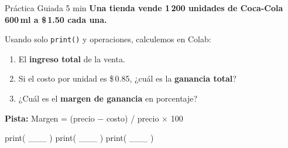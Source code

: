 \documentclass[aspectratio=169, 11pt]{beamer}
\begin{document}
\begin{frame}[fragile]{Práctica Guiada \hfill {\normalsize\color{arcaRed}\faClock\hspace{4pt}5 min}}
  \vspace{-6pt}
  {\small\color{arcaDark}\bfseries
    Una tienda vende 1\,200 unidades de Coca-Cola 600\,ml a \$\,1.50 cada una.}

  \vspace{6pt}
  {\footnotesize\color{textMuted}
  Usando solo \texttt{print()} y operaciones, calculemos en Colab:}

  \vspace{4pt}
  {\footnotesize
  \begin{enumerate}\setlength{\itemsep}{3pt}
    \item[{\color{arcaRed}\bfseries 1.}]
      El \textbf{ingreso total} de la venta.
    \item[{\color{arcaRed}\bfseries 2.}]
      Si el costo por unidad es \$\,0.85, ¿cuál es la \textbf{ganancia total}?
    \item[{\color{arcaRed}\bfseries 3.}]
      ¿Cuál es el \textbf{margen de ganancia} en porcentaje?
  \end{enumerate}
  }

  \vspace{6pt}
  {\footnotesize\color{textMuted}
    \faLightbulb[regular]\hspace{4pt}\textbf{Pista:}
    Margen = (precio $-$ costo) / precio $\times$ 100}

  \vspace{6pt}
  \begin{pyblock}[title={\scriptsize\faPlay\hspace{4pt}Tres print, tres respuestas}]
print( ___ )
print( ___ )
print( ___ )
  \end{pyblock}
\end{frame}
\end{document}
